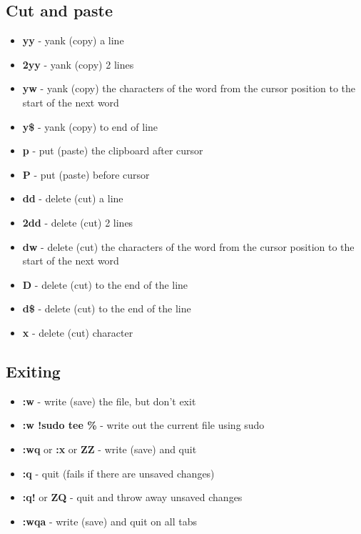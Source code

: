 \documentclass[landscape,twocolumn]{article}
\providecommand{\tightlist}{%
  \setlength{\itemsep}{0pt}\setlength{\parskip}{0pt}}
\begin{document}
\hypertarget{cut-and-paste}{%
\subsection{Cut and paste}\label{cut-and-paste}}

\begin{itemize}
\tightlist
\item
  \textbf{yy} - yank (copy) a line
\item
  \textbf{2yy} - yank (copy) 2 lines
\item
  \textbf{yw} - yank (copy) the characters of the word from the cursor
  position to the start of the next word
\item
  \textbf{y\$} - yank (copy) to end of line
\item
  \textbf{p} - put (paste) the clipboard after cursor
\item
  \textbf{P} - put (paste) before cursor
\item
  \textbf{dd} - delete (cut) a line
\item
  \textbf{2dd} - delete (cut) 2 lines
\item
  \textbf{dw} - delete (cut) the characters of the word from the cursor
  position to the start of the next word
\item
  \textbf{D} - delete (cut) to the end of the line
\item
  \textbf{d\$} - delete (cut) to the end of the line
\item
  \textbf{x} - delete (cut) character
\end{itemize}

\hypertarget{exiting}{%
\subsection{Exiting}\label{exiting}}

\begin{itemize}
\tightlist
\item
  \textbf{:w} - write (save) the file, but don't exit
\item
  \textbf{:w !sudo tee \%} - write out the current file using sudo
\item
  \textbf{:wq} or \textbf{:x} or \textbf{ZZ} - write (save) and quit
\item
  \textbf{:q} - quit (fails if there are unsaved changes)
\item
  \textbf{:q!} or \textbf{ZQ} - quit and throw away unsaved changes
\item
  \textbf{:wqa} - write (save) and quit on all tabs
\end{itemize}
\end{document}
